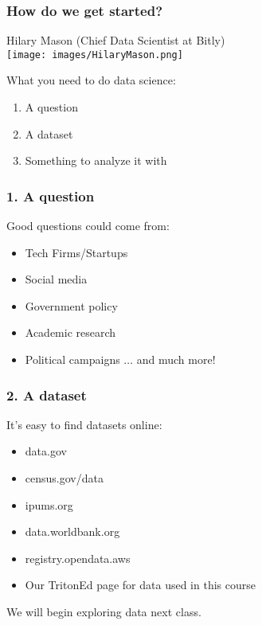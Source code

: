 \documentclass[11pt]{beamer}
\begin{document}
\begin{frame}
\frametitle{How do we get started?}
\uncover
{\begin{center}
Hilary Mason (Chief Data Scientist at Bitly) \\
\texttt{[image: images/HilaryMason.png]}
\end{center}
}
\bigskip
\uncover<+->
{What you need to do data science:}
\begin{enumerate}
\item A question
\item A dataset
\item Something to analyze it with
\end{enumerate}

\end{frame}


\begin{frame}
\frametitle{1. A question}
Good questions could come from:
\begin{itemize}
\item Tech Firms/Startups
\item Social media
\item Government policy 
\item Academic research
\item Political campaigns $\hdots$ and much more!
\end{itemize}
\end{frame}

\begin{frame}
\frametitle{2. A dataset}
It's easy to find datasets online:
\begin{itemize}
\item data.gov
\item census.gov/data
\item ipums.org
\item data.worldbank.org
\item registry.opendata.aws
\item Our TritonEd page for data used in this course \pause
\end{itemize}
We will begin exploring data next class.
\end{frame}
\end{document}
